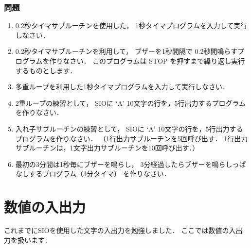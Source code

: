 \subsubsection{問題}
\begin{enumerate}
\item 0.2秒タイマサブルーチンを使用した，
1秒タイマプログラムを入力して実行しなさい．
\item 0.2秒タイマサブルーチンを利用して，
ブザーを1秒間隔で 0.2秒間鳴らすプログラムを作りなさい．
このプログラムは STOP を押すまで繰り返し実行するものとします．
\item 多重ループを利用した1秒タイマプログラムを入力して実行しなさい．
\item 2重ループの練習として，
SIOに `A' 10文字の行を，5行出力するプログラムを作りなさい．
\item 入れ子サブルーチンの練習として，
SIOに `A' 10文字の行を，5行出力するプログラムを作りなさい．
（1行出力サブルーチンを5回呼び出す．
1行出力サブルーチンは，1文字出力サブルーチンを10回呼び出す．）
\item 最初の3分間は1秒毎にブザーを鳴らし，
3分経過したらブザーを鳴らしっぱなしするプログラム（3分タイマ）
を作りなさい．
\end{enumerate}


\newpage
\section{数値の入出力}

これまでにSIOを使用した文字の入出力を勉強しました．
ここでは数値の入出力を扱います．

